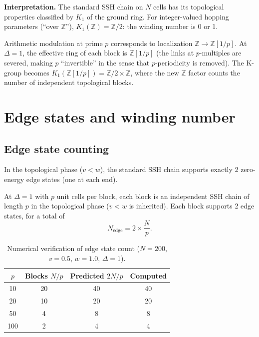 \documentclass[11pt,a4paper]{article}
\newcommand{\Zp}{\mathbb{Z}[1/p]}
\begin{document}
\textbf{Interpretation.}
The standard SSH chain on $N$ cells has its topological properties
classified by $K_1$ of the ground ring.
For integer-valued hopping parameters (``over $\mathbb{Z}$''),
$K_1(\mathbb{Z}) = \mathbb{Z}/2$: the winding number is 0 or 1.

Arithmetic modulation at prime $p$ corresponds to localization
$\mathbb{Z} \to \Zp$. At $\Delta = 1$, the effective ring of
each block is $\Zp$ (the links at $p$-multiples are severed,
making $p$ ``invertible'' in the sense that $p$-periodicity
is removed). The K-group becomes
$K_1(\Zp) = \mathbb{Z}/2 \times \mathbb{Z}$,
where the new $\mathbb{Z}$ factor counts the number of
independent topological blocks.

\section{Edge states and winding number}
\label{sec:edge}

\subsection{Edge state counting}

In the topological phase ($v < w$), the standard SSH chain
supports exactly 2 zero-energy edge states (one at each end).

At $\Delta = 1$ with $p$ unit cells per block, each block
is an independent SSH chain of length $p$ in the topological
phase ($v < w$ is inherited). Each block supports 2 edge states,
for a total of
\begin{equation}
  N_{\mathrm{edge}} = 2 \times \frac{N}{p}.
  \label{eq:nedge}
\end{equation}

\begin{table}[h]
\centering
\caption{Numerical verification of edge state count
($N = 200$, $v = 0.5$, $w = 1.0$, $\Delta = 1$).}
\label{tab:edge}
\begin{tabular}{@{}cccc@{}}
\toprule
$p$ & Blocks $N/p$ & Predicted $2N/p$ & Computed \\
\midrule
10 & 20 & 40 & 40 \\
20 & 10 & 20 & 20 \\
50 & 4 & 8 & 8 \\
100 & 2 & 4 & 4 \\
\bottomrule
\end{tabular}
\end{table}
\end{document}
